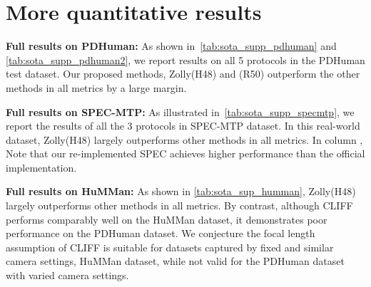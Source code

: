 \documentclass[10pt,twocolumn,letterpaper]{article}
\def\Ours{{Zolly}\xspace}
\def\Oursp{{}\xspace}
\begin{document}
{\section{More quantitative results}























\noindent\textbf{Full results on PDHuman:} As shown in~\cref{tab:sota_supp_pdhuman} and \cref{tab:sota_supp_pdhuman2}, we report results on all 5 protocols in the PDHuman test dataset. Our proposed methods, \Ours(H48) and \Oursp (R50) outperform the other methods in all metrics by a large margin. 


\noindent\textbf{Full results on SPEC-MTP:} As illustrated in~\cref{tab:sota_supp_specmtp}, we report the results of all the 3 protocols in SPEC-MTP dataset. In this real-world dataset, \Ours (H48) largely outperforms other methods in all metrics. In column , Note that our re-implemented SPEC achieves higher performance than the official implementation.
 
\noindent\textbf{Full results on HuMMan:} As shown in \cref{tab:sota_sup_humman}, \Ours (H48) largely outperforms other methods in all metrics. By contrast, although CLIFF~\cite{cliff} performs comparably well on the HuMMan dataset, it demonstrates poor performance on the PDHuman dataset. We conjecture the focal length assumption of CLIFF is suitable for datasets captured by fixed and similar camera settings, \eg HuMMan dataset, while not valid for the PDHuman dataset with varied camera settings.


\begin{table*}[hb]
    \centering
\end{table*}}
\end{document}
